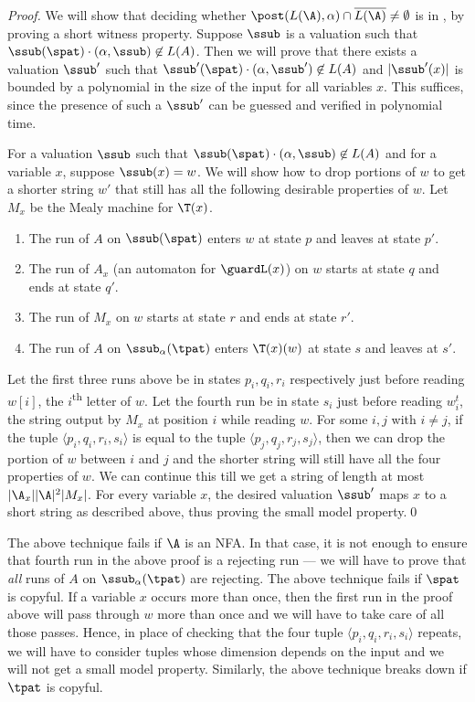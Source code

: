 \begin{proof}
	We will show that deciding whether $\post(L(\A), \alpha) \cap \overline{L(\A)} \neq \emptyset$ is in \np, by proving a short witness 
	property. Suppose $\ssub$ is a valuation such that $\ssub(\spat)\cdot (\alpha,\ssub) \not\in L(A)$. Then we will prove that there exists
	a valuation $\ssub'$ such that $\ssub'(\spat)\cdot (\alpha,\ssub') \not\in L(A)$ and $|\ssub'(x)|$ is bounded by a polynomial in the
	size of the input for all variables $x$. This suffices, since the presence of such a $\ssub'$ can be guessed and verified in
	polynomial time.

	For a valuation $\ssub$ such that $\ssub(\spat)\cdot (\alpha,\ssub) \not\in L(A)$ and for a variable $x$, suppose $\ssub(x)=w$.
	We will show how to drop portions of $w$ to get a shorter string $w'$ that still has all the following desirable properties of $w$. Let
	$M_x$ be the Mealy machine for $\T(x)$.
	\begin{enumerate}
		\item The run of $A$ on $\ssub(\spat)$ enters $w$ at state $p$ and leaves at state $p'$.
		\item The run of $A_x$ (an automaton for $\guardL(x)$) on $w$ starts at state $q$ and ends at state $q'$.
		\item The run of $M_x$ on $w$ starts at state $r$ and ends at state $r'$.
		\item The run of $A$ on $\ssub_\alpha(\tpat)$ enters $\T(x)(w)$ at state $s$ and leaves at $s'$.
	\end{enumerate}
	Let the first three runs above be in states $p_i, q_i, r_i$ respectively just before reading $w[i]$, the $i$\textsuperscript{th}
	letter of $w$. Let the fourth run be in state $s_i$ just before reading $w_i^t$, the string output by $M_x$ at position $i$
	while reading $w$. For some $i, j$ with $i \ne j$,  if the tuple $\langle p_i, q_i, r_i, s_i\rangle$ is equal to the tuple
	$\langle p_j, q_j, r_j, s_j\rangle$, then we can drop the portion of $w$ between $i$ and $j$ and the shorter string will still have
	all the four properties of $w$. We can continue this till we get a string of length at most $|\A_x||\A|^2|M_x|$. For every variable
	$x$, the desired valuation $\ssub'$ maps $x$ to a short string as described above, thus proving the small model property.\qed
\end{proof}

The above technique fails if $\A$ is an NFA. In that case, it is not enough to ensure that fourth run in the above proof is a rejecting
run --- we will have to prove that \emph{all} runs of $A$ on $\ssub_\alpha(\tpat)$ are rejecting. The above technique fails if $\spat$
is copyful. If a variable $x$ occurs more than once, then the first run in the proof above will pass through $w$ more than once and we
will have to take care of all those passes. Hence, in place of checking that the four tuple $\langle p_i, q_i, r_i, s_i\rangle$ repeats,
we will have to consider tuples whose dimension depends on the input and we will not get a small model property. Similarly, the above
technique breaks down if $\tpat$ is copyful.

